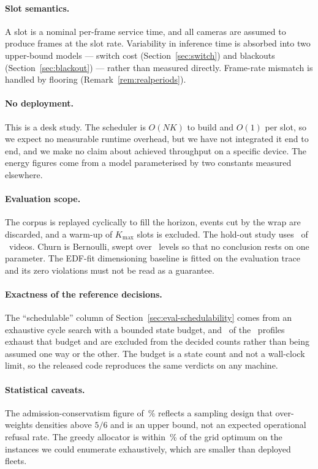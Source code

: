 \documentclass[preprint,review,12pt]{elsarticle}
\theoremstyle{definition}
\newcommand{\Nc}{N}
\begin{document}
\paragraph{Slot semantics.} A slot is a nominal per-frame service time, and all cameras are
assumed to produce frames at the slot rate. Variability in inference time is absorbed into two
upper-bound models --- switch cost (Section~\ref{sec:switch}) and blackouts
(Section~\ref{sec:blackout}) --- rather than measured directly. Frame-rate mismatch is handled by
flooring (Remark~\ref{rem:realperiods}).

\paragraph{No deployment.} This is a desk study. The scheduler is $O(\Nc K)$ to build and $O(1)$
per slot, so we expect no measurable runtime overhead, but we have not integrated it end to end,
and we make no claim about achieved throughput on a specific device. The energy figures come from
a model parameterised by two constants measured elsewhere.

\paragraph{Evaluation scope.} The corpus is replayed cyclically to fill the horizon, events cut by
the wrap are discarded, and a warm-up of $K_{\max}$ slots is excluded. The hold-out study uses
\numHoldoutVideos\ of \numHoldoutTotal\ videos. Churn is Bernoulli, swept over
\numEfiveLamLevels\ levels so that no conclusion rests on one parameter. The EDF-fit dimensioning
baseline is fitted on the evaluation trace and its zero violations must not be read as a
guarantee.

\paragraph{Exactness of the reference decisions.} The ``schedulable'' column of
Section~\ref{sec:eval-schedulability} comes from an exhaustive cycle search with a bounded state
budget, and \numEoneUndecided\ of the \numEoneInstances\ profiles exhaust that budget and are
excluded from the decided counts rather than being assumed one way or the other. The budget is a
state count and not a wall-clock limit, so the released code reproduces the same verdicts on any
machine.

\paragraph{Statistical caveats.} The admission-conservatism figure of \numConservPct\,\% reflects a
sampling design that over-weights densities above $5/6$ and is an upper bound, not an expected
operational refusal rate. The greedy allocator is within \numCsixGapMax\,\% of the grid optimum on
the instances we could enumerate exhaustively, which are smaller than deployed fleets.
\end{document}
